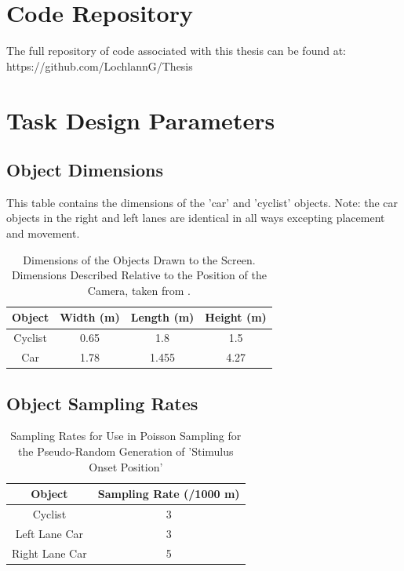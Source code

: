 \begin{appendices}
\chapter{Code Repository}
\label{appendix:Code}
The full repository of code associated with this thesis can be found at: https://github.com/LochlannG/Thesis

\chapter{Task Design Parameters}
\label{appendix:DesignParams1}
\section{Object Dimensions}
This table contains the dimensions of the 'car' and 'cyclist' objects. Note: the car objects in the right and left lanes are identical in all ways excepting placement and movement.
\begin{table}[H]
    \begin{center}
        \caption{Dimensions of the Objects Drawn to the Screen. Dimensions Described Relative to the Position of the Camera, taken from \citet{ntaCycleDesignManual2023, mastersWhatAreAverage2021}.}
        \label{tab:Dimensions}
        \begin{tabular}{c|c|c|c}\hline
            Object      &   Width (m) & Length (m) & Height (m)\\\hline
            Cyclist      &   0.65  & 1.8 & 1.5 \\
            Car      &   1.78  & 1.455 & 4.27 \\\hline
        \end{tabular}
    \end{center}
\end{table}

\section{Object Sampling Rates}
\begin{table}[H]
    \begin{center}
        \caption{Sampling Rates for Use in Poisson Sampling for the Pseudo-Random Generation of 'Stimulus Onset Position'}
        \label{tab:SamplingRate}
        \begin{tabular}{c|c}\hline
            Object          &   Sampling Rate (/1000 m)\\\hline
            Cyclist         &   3\\
            Left Lane Car   &   3\\
            Right Lane Car  &   5\\\hline
        \end{tabular}
    \end{center}
\end{table}

\end{appendices}
